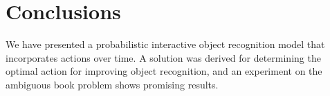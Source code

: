 \section{Conclusions}

We have presented a probabilistic interactive object recognition model that incorporates actions over time.  A solution was derived for determining the optimal action for improving object recognition, and an experiment on the ambiguous book problem shows promising results.


   